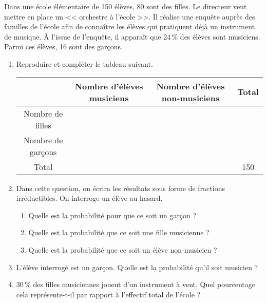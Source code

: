 Dans une école élémentaire de 150 élèves, 80 sont des filles. Le directeur veut mettre en place un << orchestre à l’école >>. Il réalise une enquête auprès des familles de l’école afin de connaître les élèves qui pratiquent déjà un instrument de musique. \newline
   À l’issue de l’enquête, il apparaît que 24\,\% des élèves sont musiciens. Parmi ces élèves, 16 sont des garçons.
   \begin{enumerate}
      \setlength{\itemsep}{-1mm}
      \item Reproduire et compléter le tableau suivant.
         \begin{center}
            {
            \begin{tabular}{|C{3}|C{3}|C{3}|C{3}|}
               \hline
               & Nombre d'élèves musiciens & Nombre d'élèves non-musiciens & Total \\
               \hline
               Nombre de filles & & & \\
               \hline
               Nombre de garçons & & & \\
               \hline
               Total & & & 150 \\
               \hline
            \end{tabular}}
         \end{center}
      \item Dans cette question, on écrira les résultats sous forme de fractions irréductibles. \newline
         On interroge un élève au hasard.
         \begin{enumerate}
            \item Quelle est la probabilité pour que ce soit un garçon ?
            \item Quelle est la probabilité que ce soit une fille musicienne ?
            \item Quelle est la probabilité que ce soit un élève non-musicien ?
         \end{enumerate}
      \item L’élève interrogé est un garçon. Quelle est la probabilité qu’il soit musicien ?
      \item 30\,\% des filles musiciennes jouent d’un instrument à vent. \newline
         Quel pourcentage cela représente-t-il par rapport à l’effectif total de l’école ?   
   \end{enumerate}